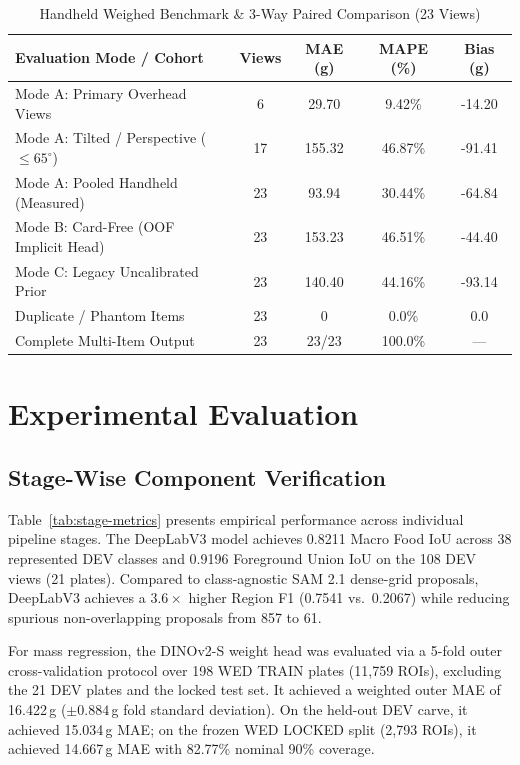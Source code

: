 \documentclass[conference]{IEEEtran}
\begin{document}
\begin{table}[!t]
\caption{Handheld Weighed Benchmark \& 3-Way Paired Comparison (23 Views)}
\label{tab:e2e-metrics}
\centering
\scriptsize
\setlength{\tabcolsep}{3pt}
\begin{tabular}{lcccc}
\toprule
\textbf{Evaluation Mode / Cohort} & \textbf{Views} & \textbf{MAE (g)} & \textbf{MAPE (\%)} & \textbf{Bias (g)} \\
\midrule
Mode A: Primary Overhead Views & 6 & 29.70 & 9.42\% & -14.20 \\
Mode A: Tilted / Perspective ($\le 65^\circ$) & 17 & 155.32 & 46.87\% & -91.41 \\
Mode A: Pooled Handheld (Measured) & 23 & 93.94 & 30.44\% & -64.84 \\
\midrule
Mode B: Card-Free (OOF Implicit Head) & 23 & 153.23 & 46.51\% & -44.40 \\
Mode C: Legacy Uncalibrated Prior & 23 & 140.40 & 44.16\% & -93.14 \\
\midrule
Duplicate / Phantom Items & 23 & 0 & 0.0\% & 0.0 \\
Complete Multi-Item Output & 23 & 23/23 & 100.0\% & — \\
\bottomrule
\end{tabular}
\end{table}

\section{Experimental Evaluation}

\subsection{Stage-Wise Component Verification}
Table~\ref{tab:stage-metrics} presents empirical performance across individual pipeline stages.
The DeepLabV3 model achieves 0.8211 Macro Food IoU across 38 represented DEV classes and 0.9196 Foreground Union IoU on the 108 DEV views (21 plates). Compared to class-agnostic SAM 2.1 dense-grid proposals, DeepLabV3 achieves a $3.6\times$ higher Region F1 (0.7541 vs.\ 0.2067) while reducing spurious non-overlapping proposals from 857 to 61.

For mass regression, the DINOv2-S weight head was evaluated via a 5-fold outer cross-validation protocol over 198 WED TRAIN plates (11,759 ROIs), excluding the 21 DEV plates and the locked test set. It achieved a weighted outer MAE of 16.422\,g ($\pm 0.884$\,g fold standard deviation). On the held-out DEV carve, it achieved 15.034\,g MAE; on the frozen WED LOCKED split (2,793 ROIs), it achieved 14.667\,g MAE with 82.77\% nominal 90\% coverage.
\end{document}
